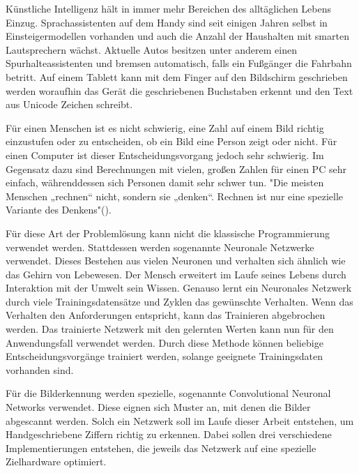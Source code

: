 \documentclass[../main.tex]{subfiles}
\begin{document}
Künstliche Intelligenz hält in immer mehr Bereichen des alltäglichen Lebens Einzug. Sprachassistenten auf dem Handy sind seit einigen Jahren selbst in Einsteigermodellen vorhanden und auch die Anzahl der Haushalten mit smarten Lautsprechern wächst. Aktuelle Autos besitzen unter anderem einen Spurhalteassistenten und bremsen automatisch, falls ein Fußgänger die Fahrbahn betritt. Auf einem Tablett kann mit dem Finger auf den Bildschirm geschrieben werden woraufhin das Gerät die geschriebenen Buchstaben erkennt und den Text aus Unicode Zeichen schreibt.

Für einen Menschen ist es nicht schwierig, eine Zahl auf einem Bild richtig einzustufen oder zu entscheiden, ob ein Bild eine Person zeigt oder nicht. Für einen Computer ist dieser Entscheidungsvorgang jedoch sehr schwierig. 
Im Gegensatz dazu sind Berechnungen mit vielen, großen Zahlen für einen PC sehr einfach, währenddessen sich Personen damit sehr schwer tun. "Die meisten Menschen „rechnen“ nicht, sondern sie „denken“. Rechnen ist nur eine spezielle Variante des Denkens"(\cite{articleKuenstlichesGehirn}).

Für diese Art der Problemlösung kann nicht die klassische Programmierung verwendet werden. Stattdessen werden sogenannte Neuronale Netzwerke verwendet. Dieses Bestehen aus vielen Neuronen und verhalten sich ähnlich wie das Gehirn von Lebewesen. 
Der Mensch erweitert im Laufe seines Lebens durch Interaktion mit der Umwelt sein Wissen. Genauso lernt ein Neuronales Netzwerk durch viele Trainingsdatensätze und Zyklen das gewünschte Verhalten. Wenn das Verhalten den Anforderungen entspricht, kann das Trainieren abgebrochen werden. Das trainierte Netzwerk mit den gelernten Werten kann nun für den Anwendungsfall verwendet werden. Durch diese Methode können beliebige Entscheidungsvorgänge trainiert werden, solange geeignete Trainingsdaten vorhanden sind.

Für die Bilderkennung werden spezielle, sogenannte {Convolutional Neuronal Networks} verwendet. Diese eignen sich Muster an, mit denen die Bilder abgescannt werden. Solch ein Netzwerk soll im Laufe dieser Arbeit entstehen, um Handgeschriebene Ziffern richtig zu erkennen. Dabei sollen drei verschiedene Implementierungen entstehen, die jeweils das Netzwerk auf eine spezielle Zielhardware optimiert.
\end{document}
